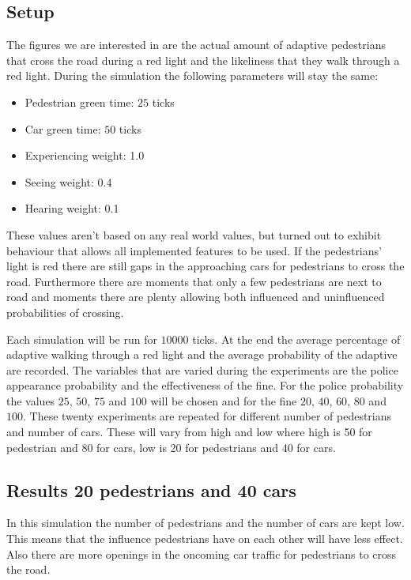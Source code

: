 \documentclass[a4paper]{article}
\begin{document}
\subsection{Setup}
The figures we are interested in are the actual amount of adaptive pedestrians that cross the road during a red light and the likeliness that they walk through a red light. During the simulation the following parameters will stay the same:
\begin{itemize}
\item Pedestrian green time: $25$ ticks
\item Car green time: $50$ ticks
\item Experiencing weight: 1.0
\item Seeing weight: 0.4
\item Hearing weight: 0.1
\end{itemize}
These values aren't based on any real world values, but turned out to exhibit behaviour that allows all implemented features to be used. If the pedestrians' light is red there are still gaps in the approaching cars for pedestrians to cross the road. Furthermore there are moments that only a few pedestrians are next to road and moments there are plenty allowing both influenced and uninfluenced probabilities of crossing. 

Each simulation will be run for $10000$ ticks. At the end the average percentage of adaptive walking through a red light and the average probability of the adaptive are recorded. The variables that are varied during the experiments are the police appearance probability and the effectiveness of the fine. For the police probability the values $25$, $50$, $75$ and $100$ will be chosen and for the fine $20$, $40$, $60$, $80$ and $100$. These twenty experiments are repeated for different number of pedestrians and number of cars. These will vary from high and low where high is 50 for pedestrian and 80 for cars, low is 20 for pedestrians and 40 for cars.

\clearpage
\subsection{Results 20 pedestrians and 40 cars}
In this simulation the number of pedestrians and the number of cars are kept low. This means that the influence pedestrians have on each other will have less effect. Also there are more openings in the oncoming car traffic for pedestrians to cross the road.
\end{document}
